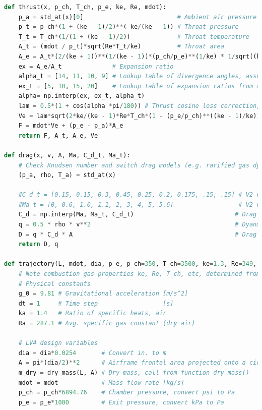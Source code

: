 \documentclass[]{aiaa-tc}%
\begin{document}
\begin{lstlisting}[language=Python]
def thrust(x, p_ch, T_ch, p_e, ke, Re, mdot):
    p_a = std_at(x)[0]                          # Ambient air pressure [Pa]
    p_t = p_ch*(1 + (ke - 1)/2)**(-ke/(ke - 1)) # Throat pressure      [Pa]
    T_t = T_ch*(1/(1 + (ke - 1)/2))             # Throat temperature   [K]
    A_t = (mdot / p_t)*sqrt(Re*T_t/ke)          # Throat area          [m^2]
    A_e = A_t*(2/(ke + 1))**(1/(ke - 1))*(p_ch/p_e)**(1/ke) * 1/sqrt((ke + 1)/(ke - 1)*(1 - (p_e/p_ch)**((ke - 1)/ke))) # Exit area [m^2]
    ex = A_e/A_t              # Expansion ratio
    alpha_t = [14, 11, 10, 9] # Lookup table of divergence angles, assuming 80% bell length
    ex_t = [5, 10, 15, 20]    # Lookup table of expansion ratios from alpha_t
    alpha= np.interp(ex, ex_t, alpha_t)
    lam = 0.5*(1 + cos(alpha *pi/180)) # Thrust cosine loss correction, even in extreme cases this is definitely not an O(1) effect 
    Ve = lam*sqrt(2*ke/(ke - 1)*Re*T_ch*(1 - (p_e/p_ch)**((ke - 1)/ke))) # Exhaust velocity                                  [m/s]
    F = mdot*Ve + (p_e - p_a)*A_e                                        # Thrust force, ignoring that isp increases w/ p_ch [N]
    return F, A_t, A_e, Ve

def drag(x, v, A, Ma, C_d_t, Ma_t):
    # Check Knudsen number and switch drag models (e.g. rarified gas dyn vs. quadratic drag)
    (p_a, rho, T_a) = std_at(x)
    
    #C_d_t = [0.15, 0.15, 0.3, 0.45, 0.25, 0.2, 0.175, .15, .15] # V2 rocket drag coefficient lookup table
    #Ma_t = [0, 0.6, 1.0, 1.1, 2, 3, 4, 5, 5.6]                  # V2 rocket Mach number lookup table
    C_d = np.interp(Ma, Ma_t, C_d_t)                            # Drag coefficient function
    q = 0.5 * rho * v**2                                        # Dyanmic pressure [Pa]
    D = q * C_d * A                                             # Drag force       [N]
    return D, q

def trajectory(L, mdot, dia, p_e, p_ch=350, T_ch=3500, ke=1.3, Re=349, x_init=0):
    # Note combustion gas properties ke, Re, T_ch, etc, determined from CEA
    # Physical constants
    g_0 = 9.81 # Gravitational acceleration [m/s^2]
    dt = 1     # Time step                  [s]
    ka = 1.4   # Ratio of specific heats, air  
    Ra = 287.1 # Avg. specific gas constant (dry air)
    
    # LV4 design variables
    dia = dia*0.0254       # Convert in. to m
    A = pi*(dia/2)**2      # Airframe frontal area projected onto a circle of diameter variable dia
    m_dry = dry_mass(L, A) # Dry mass, call from function dry_mass()
    mdot = mdot            # Mass flow rate [kg/s]
    p_ch = p_ch*6894.76    # Chamber pressure, convert psi to Pa
    p_e = p_e*1000         # Exit pressure, convert kPa to Pa


\end{lstlisting}
\end{document}
